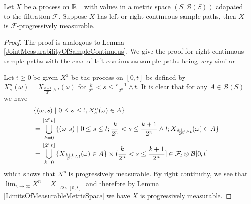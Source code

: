 \begin{lem}\label{ContinuityAndProgressiveMeasurability}Let $X$ be a
  process on $\mathbb{R}_+$ with values in a metric space $(S,
  \mathcal{B}(S))$ adapated to the filtration
  $\mathcal{F}$.  Suppose $X$ has left or right continuous sample
  paths, then $X$ is $\mathcal{F}$-progressively measurable.
\end{lem}
\begin{proof}
The proof is analogous to Lemma
\ref{JointMeasurabilityOfSampleContinuous}.  We give the proof for
right continuous sample paths with the case of left continuous sample
paths being very similar.

Let $t \geq 0$ be given $X^n$ be the process on $[0,t]$ be defined by $X^n_s(\omega) =
X_{\frac{k+1}{2^n} \wedge t}(\omega)$ for $\frac{k}{2^n} < s \leq \frac{k+1}{2^n} \wedge t$.
It is clear that for any $A \in \mathcal{B}(S)$ we have
\begin{align*}
&\lbrace (\omega, s) \mid 0 \leq s \leq t ; X^n_s(\omega) \in A \rbrace \\
&= \bigcup_{k=0}^{\lfloor 2^n t \rfloor} \lbrace (\omega, s) \mid 0 \leq s \leq t ; \frac{k}{2^n} < s \leq \frac{k+1}{2^n}
\wedge t ;X_{\frac{k+1}{2^n} \wedge t}(\omega) \in A \rbrace \\
&=\bigcup_{k=0}^{\lfloor 2^n t \rfloor} \lbrace X_{\frac{k+1}{2^n} \wedge t}(\omega) \in A \rbrace
\times (\frac{k}{2^n} < s \leq \frac{k+1}{2^n}] \in \mathcal{F}_t \otimes \mathcal{B}[0,t]\\
\end{align*}
which shows that $X^n$ is progressively measurable.  By right
continuity, we see that $\lim_{n \to \infty} X^n = X\mid_{\Omega
  \times [0,t]}$ and therefore by Lemma
  \ref{LimitsOfMeasurableMetricSpace} we have $X$ is progressively measurable.
\end{proof}

